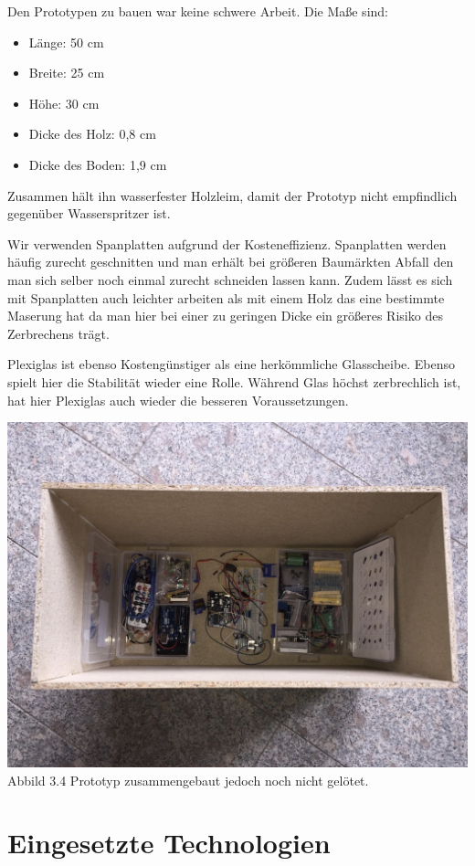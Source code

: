 Den Prototypen zu bauen war keine schwere Arbeit. Die Maße sind:
\begin{itemize}
	\item Länge: 50 cm
	\item Breite: 25 cm
	\item Höhe: 30 cm
	\item Dicke des Holz: 0,8 cm 
	\item Dicke des Boden: 1,9 cm
\end{itemize}

Zusammen hält ihn wasserfester Holzleim, damit der Prototyp nicht empfindlich gegenüber Wasserspritzer ist. 

Wir verwenden Spanplatten aufgrund der Kosteneffizienz. Spanplatten werden häufig zurecht geschnitten und man erhält bei größeren Baumärkten Abfall den man sich selber noch einmal zurecht schneiden lassen kann. Zudem lässt es sich mit Spanplatten auch leichter arbeiten als mit einem Holz das eine bestimmte Maserung hat da man hier bei einer zu geringen Dicke ein größeres Risiko des Zerbrechens trägt.

Plexiglas ist ebenso Kostengünstiger als eine herkömmliche Glasscheibe. Ebenso spielt hier die Stabilität wieder eine Rolle. Während Glas höchst zerbrechlich ist, hat hier Plexiglas auch wieder die besseren Voraussetzungen.

 {\includegraphics[width=0.8\linewidth]{figures/Kasten-innen.jpeg}}
\\Abbild 3.4 Prototyp zusammengebaut jedoch noch nicht gelötet.
\chapter{Eingesetzte Technologien} \label{sec:tech}






